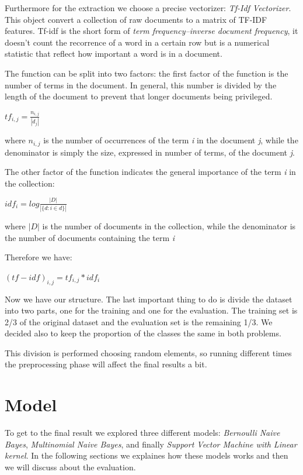 \documentclass[12pt]{article}
\begin{document}
Furthermore for the extraction we choose a precise vectorizer: {\em Tf-Idf Vectorizer}. This object convert a collection of raw documents to a matrix of TF-IDF features. Tf-idf is the short form of {\em term frequency–inverse document frequency}, it doesn't count the recorrence of a word in a certain row but is a numerical statistic that reflect how important a word is in a document.

The function can be split into two factors: the first factor of the function is the number of terms in the document. In general, this number is divided by the length of the document to prevent that longer documents being privileged.

\bigskip
$tf_{i,j} = \displaystyle \frac {n_{i,j}}{|d_j|} $
\bigskip

where $n_{i,j}$ is the number of occurrences of the term {\em i} in the document {\em j}, while the denominator is simply the size, expressed in number of terms, of the document {\em j}.

The other factor of the function indicates the general importance of the term {\em i} in the collection:

\bigskip
$idf_{i} = log \displaystyle \frac {|D|}{|\{ d : i \in d \}|} $
\bigskip

where $|D|$ is the number of documents in the collection, while the denominator is the number of documents containing the term {\em i}

Therefore we have:

\bigskip
$(tf-idf)_{i,j} = tf_{i,j} * idf_{i}$
\bigskip

Now we have our structure. The last important thing to do is divide the dataset into two parts, one for the training and one for the evaluation. The training set is 2/3 of the original dataset and the evaluation set is the remaining 1/3. We decided also to keep the proportion of the classes the same in both problems.

This division is performed choosing random elements, so running different times the preprocessing phase will affect the final results a bit.

\section{Model}
To get to the final result we explored three different models: {\em Bernoulli Naive Bayes}, {\em Multinomial Naive Bayes}, and finally {\em Support Vector Machine with Linear kernel}. In the following sections we explaines how these models works and then we will discuss about the evaluation.
\end{document}
